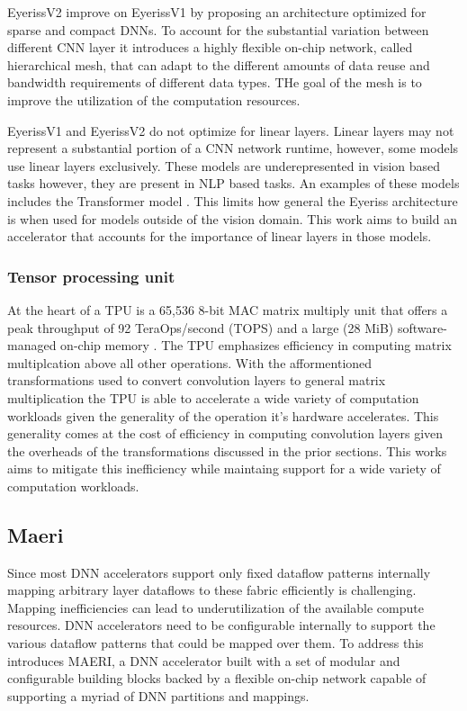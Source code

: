 EyerissV2 \cite{eyerissv2} improve on EyerissV1 by proposing an architecture
optimized for sparse and compact DNNs. To account for the substantial variation
between different CNN layer it introduces a highly flexible on-chip network,
called hierarchical mesh, that can adapt to the different amounts of data reuse
and bandwidth requirements of different data types. THe goal of the mesh is to
improve the utilization of the computation resources.

EyerissV1 and EyerissV2 do not optimize for linear layers. Linear layers may not
represent a substantial portion of a CNN network runtime, however, some models
use linear layers exclusively. These models are underepresented in vision based
tasks however, they are present in NLP based tasks. An examples of these
models includes the Transformer model \cite{transformer_model}. This limits how general the
Eyeriss architecture is when used for models outside of the vision domain. This
work aims to build an accelerator that accounts for the importance of linear
layers in those models. 

\subsubsection{Tensor processing unit}
\label{chap:related_work:tpu  }

At the heart of a TPU is a 65,536 8-bit MAC matrix multiply unit that offers a
peak throughput of 92 TeraOps/second (TOPS) and a large (28 MiB)
software-managed on-chip memory \cite{tpu}. The TPU emphasizes efficiency in
computing matrix multiplcation above all other operations. With the
afformentioned transformations used to convert convolution layers to general
matrix multiplication the TPU is able to accelerate a wide variety of
computation workloads given the generality of the operation it's hardware
accelerates. This generality comes at the cost of efficiency in computing
convolution layers given the overheads of the transformations discussed in the
prior sections. This works aims to mitigate this inefficiency while maintaing
support for a wide variety of computation workloads. 


\subsection{Maeri}
\label{chap:related_work:maeri}

Since most DNN accelerators support only fixed dataflow patterns internally
mapping arbitrary layer dataflows to these fabric efficiently is challenging.
Mapping inefficiencies can lead to underutilization of the available compute
resources. DNN accelerators need to be configurable internally to support the
various dataflow patterns that could be mapped over them. To address this
\cite{maeri} introduces MAERI, a DNN accelerator built with a set of modular and
configurable building blocks backed by a flexible on-chip network capable of
supporting a myriad of DNN partitions and mappings. 

